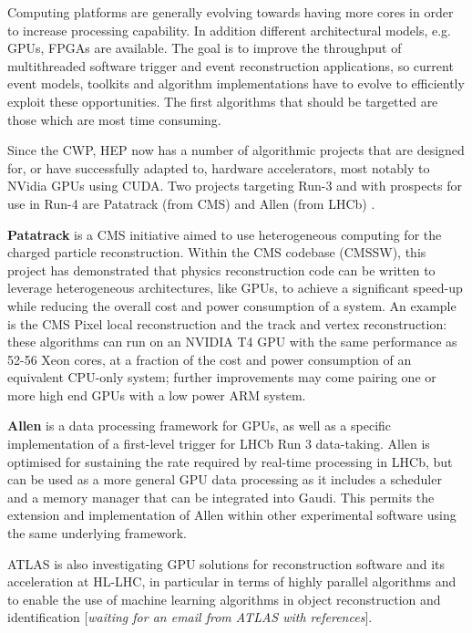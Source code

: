 Computing platforms are generally evolving towards having more cores in
order to increase processing capability. In addition different
architectural models, e.g. GPUs, FPGAs are available.
The goal is to improve the throughput of multithreaded
software trigger and event reconstruction applications, so current
event models, toolkits and algorithm implementations have to evolve to
efficiently exploit these opportunities. The first algorithms that should be
targetted are those which are most time consuming.

Since the CWP, HEP now has a number of algorithmic projects that are
designed for, or have successfully adapted to, hardware accelerators,
most notably to NVidia GPUs using CUDA. Two projects targeting Run-3 and
with prospects for use in Run-4 are Patatrack (from CMS) \cite{andrea_bocci_2019_3598824} and
Allen (from LHCb) \cite{Aaij:2019zbu}.

\textbf{Patatrack} is a CMS initiative aimed to use heterogeneous
computing for the charged particle reconstruction. Within the CMS
codebase (CMSSW), this project has demonstrated that physics
reconstruction code can be written to leverage heterogeneous
architectures, like GPUs, to achieve a significant speed-up while
reducing the overall cost and power consumption of a system. An example
is the CMS Pixel local reconstruction and the track and vertex
reconstruction: these algorithms can run on an NVIDIA T4 GPU with the
same performance as 52-56 Xeon cores, at a fraction of the cost and
power consumption of an equivalent CPU-only system; further improvements
may come pairing one or more high end GPUs with a low power ARM system.

\textbf{Allen} is a data processing framework for GPUs, as well as a
specific implementation of a first-level trigger for LHCb Run 3
data-taking. Allen is optimised for sustaining the rate required by
real-time processing in LHCb, but can be used as a more general GPU data
processing as it includes a scheduler and a memory manager that can be
integrated into Gaudi. This permits the extension and implementation of
Allen within other experimental software using the same underlying
framework.

ATLAS is also investigating GPU solutions for reconstruction software
and its acceleration at HL-LHC, in particular in terms of highly
parallel algorithms \cite{attila_krasznahorkay_2019_3599103} and to enable the use of machine learning
algorithms in object reconstruction and identification {[}\emph{waiting
for an email from ATLAS with references}{]}.

